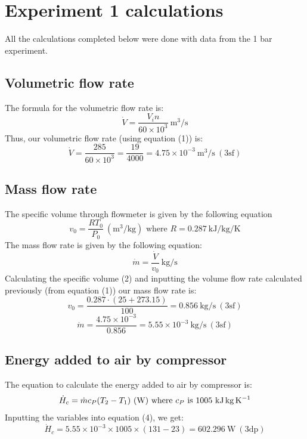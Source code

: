 \documentclass[class=article, crop=false, 12pt,a4paper]{standalone}
\begin{document}
\section{Experiment 1 calculations}
All the calculations completed below were done with data from the 1 bar experiment.
\subsection{Volumetric flow rate}
The formula for the volumetric flow rate is:
\begin{equation}
  \dot{V} = \frac{V_in}{60 \times 10^3} \ \si{\meter\cubed\per\second}
  \label{volflowrate}
\end{equation}
Thus, our volumetric flow rate (using equation (1)) is:
\[ \dot{V} = \frac{285}{60\times 10^3} = \frac{19}{4000} = 4.75 \times 10^{-3} \ \si{\meter\cubed\per\second} \ (3\textrm{sf})\]
\subsection{Mass flow rate}
The specific volume through flowmeter is given by the following equation
\begin{equation}
  v_0 = \frac{RT_0}{P_0} \ (\si{\meter\cubed\per\kg}) \textrm{ where \(R = 0.287 \ \si{\kilo\joule\per\kg\per\kelvin}\)}
  \label{specvol}
\end{equation}
The mass flow rate is given by the following equation:
\begin{equation}
  \dot{m} = \frac{\dot{V}}{v_0} \ \si{\kg\per\second}
  \label{massflowrate}
\end{equation}
Calculating the specific volume (2) and inputting the volume flow rate calculated previously (from equation (1)) our mass flow rate is:
\[ v_0 = \frac{0.287 \cdot (25+273.15)}{100} = 0.856 \ \si{\kg\per\second} \ (3\textrm{sf})  \]
\[ \dot{m} = \frac{4.75 \times 10^{-3}}{0.856} = 5.55 \times 10^{-3} \ \si{\kg\per\second} \ (3\textrm{sf}) \]
\subsection{Energy added to air by compressor}
The equation to calculate the energy added to air by compressor is:
\begin{equation}
  \dot{H}_c = \dot{m}c_P(T_2-T_1) \ (\si{\watt}) \textrm{ where \(c_P\) is 1005 \si{\kilo\joule\kg\per\kelvin}}
  \label{energyaddaircompressor}
\end{equation}
Inputting the variables into equation (4), we get: 
\[ \dot{H}_c = 5.55 \times 10^{-3} \times 1005 \times (131-23) = 602.296 \ \si{\watt} \ (3\textrm{dp}) \]
\end{document}
